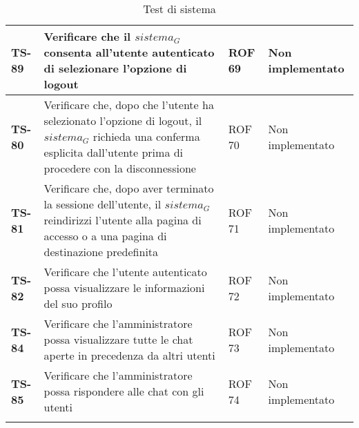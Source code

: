 \begin{longtable}{|>{\centering\arraybackslash}p{1.5cm}|p{9.8cm}|p{2cm}|p{3.5cm}|}
    \hline
    \rowcolor{gray!10}
    \textbf{TS-89} & Verificare che il $\textit{sistema}_G$ consenta all'utente autenticato di selezionare l'opzione di logout & ROF 69 & Non implementato \\
    \hline
    \rowcolor{gray!10}
    \textbf{TS-80} & Verificare che, dopo che l'utente ha selezionato l'opzione di logout, il $\textit{sistema}_G$ richieda una conferma esplicita dall'utente prima di procedere con la disconnessione & ROF 70 & Non implementato \\ 
    \hline
    \rowcolor{gray!10}
    \textbf{TS-81} & Verificare che, dopo aver terminato la sessione dell'utente, il $\textit{sistema}_G$ reindirizzi l'utente alla pagina di accesso o a una pagina di destinazione predefinita & ROF 71 & Non implementato \\ 
    \hline
    \rowcolor{gray!10}
    \textbf{TS-82} & Verificare che l'utente autenticato possa visualizzare le informazioni del suo profilo & ROF 72 & Non implementato \\ 
    \hline
    \rowcolor{gray!10}
    \textbf{TS-84} & Verificare che l'amministratore possa visualizzare tutte le chat aperte in precedenza da altri utenti& ROF 73 & Non implementato \\ 
    \hline
    \rowcolor{gray!10}
    \textbf{TS-85} & Verificare che l'amministratore possa rispondere alle chat con gli utenti & ROF 74 & Non implementato \\ 
    \hline
    \caption{Test di sistema} 
    \label{tab:test_sistema}
    \end{longtable}
    
